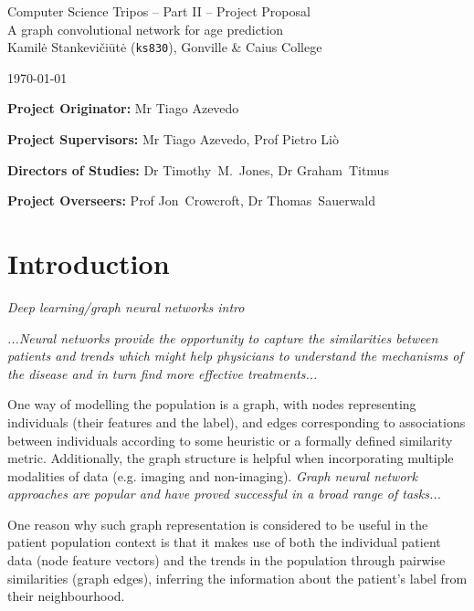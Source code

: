 \documentclass[12pt,a4paper,twoside]{article}
\begin{document}
\begin{center}
\Large
Computer Science Tripos -- Part II -- Project Proposal\\[4mm]
\LARGE
A graph convolutional network for age prediction \\[4mm]

\large
Kamilė Stankevičiūtė (\texttt{ks830}), Gonville \& Caius College

\today %
\end{center}

\vspace{5mm}
\textbf{Project Originator:} Mr Tiago Azevedo

\textbf{Project Supervisors:} Mr Tiago Azevedo, Prof Pietro Liò

\textbf{Directors of Studies:} Dr Timothy~M.~Jones, Dr Graham~Titmus

\textbf{Project Overseers:} Prof Jon~Crowcroft, Dr Thomas~Sauerwald


\section*{Introduction}

\textit{Deep learning/graph neural networks intro}

\textit{...Neural networks provide the opportunity to capture the similarities between patients and trends which might help physicians to understand the mechanisms of the disease and in turn find more effective treatments...}

One way of modelling the population is a graph, with nodes representing individuals (their features and the label), and edges corresponding to associations between individuals according to some heuristic or a formally defined similarity metric. Additionally, the graph structure is helpful when incorporating multiple modalities of data (e.g. imaging and non-imaging). \textit{Graph neural network approaches are popular and have proved successful in a broad range of tasks...}

One reason why such graph representation is considered to be useful in the patient population context is that it makes use of both the individual patient data (node feature vectors) and the trends in the population through pairwise similarities (graph edges), inferring the information about the patient's label from their neighbourhood.
\end{document}

